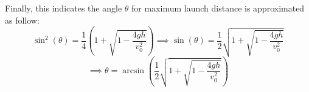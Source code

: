 \documentclass{article}
\newtheorem{question}{Question}
\begin{document}
Finally, this indicates the angle $\theta$ for maximum launch distance is approximated as follow:
$$\sin^2(\theta)=\frac{1}{4}\left(1+\sqrt{1-\frac{4gh}{v_0^2}}\right)\implies \sin(\theta)=\frac{1}{2}\sqrt{1+\sqrt{1-\frac{4gh}{v_0^2}}}$$
$$\implies \theta = \arcsin\left(\frac{1}{2}\sqrt{1+\sqrt{1-\frac{4gh}{v_0^2}}}\right)$$

\break

\end{document}
